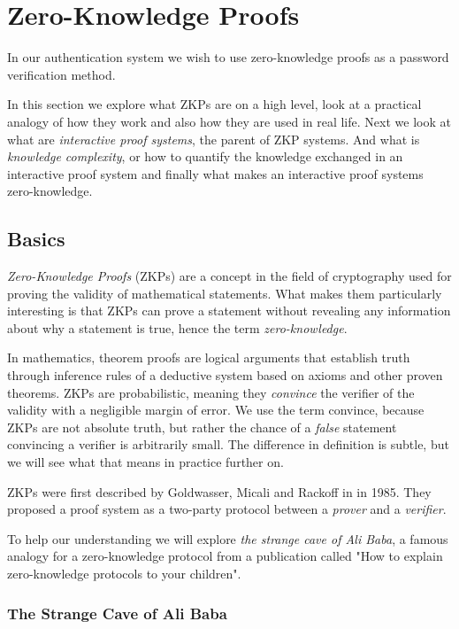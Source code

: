 \section{Zero-Knowledge Proofs}
In our authentication system we wish to use zero-knowledge proofs as a password verification method.

In this section we explore what ZKPs are on a high level, look at a practical analogy of how they work and also how they are used in real life.
Next we look at what are \textit{interactive proof systems}, the parent of ZKP systems.
And what is \textit{knowledge complexity}, or how to quantify the knowledge exchanged in an interactive proof system and finally what makes an interactive proof systems zero-knowledge.

\subsection{Basics}
\textit{Zero-Knowledge Proofs} (ZKPs) are a concept in the field of cryptography used for proving the validity of mathematical statements.
What makes them particularly interesting is that ZKPs can prove a statement without revealing any information about why a statement is true, hence the term \textit{zero-knowledge}.

In mathematics, theorem proofs are logical arguments that establish truth through inference rules of a deductive system based on axioms and other proven theorems.
ZKPs are probabilistic, meaning they \textit{convince} the verifier of the validity with a negligible margin of error.
We use the term convince, because ZKPs are not absolute truth, but rather the chance of a \textit{false} statement convincing a verifier is arbitrarily small. 
The difference in definition is subtle, but we will see what that means in practice further on.

ZKPs were first described by Goldwasser, Micali and Rackoff in \cite{goldwasser1989knowledge} in 1985. 
They proposed a proof system as a two-party protocol between a \textit{prover} and a \textit{verifier}.

To help our understanding we will explore \cite{QJM} \textit{the strange cave of Ali Baba}, a famous analogy for a zero-knowledge protocol from a publication called "How to explain zero-knowledge protocols to your children".

\newpage
\subsubsection{The Strange Cave of Ali Baba}

